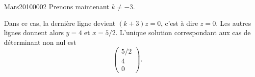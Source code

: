 \begin{corrige}{Mars20100002}
	Prenons maintenant $k\neq -3$.

	Dans ce cas, la dernière ligne devient $(k+3)z=0$, c'est à dire $z=0$. Les autres lignes donnent alors $y=4$ et $x=5/2$. L'unique solution correspondant aux cas de déterminant non nul est
	\begin{equation}
		\begin{pmatrix}
			5/2	\\ 
			4	\\ 
			0	
		\end{pmatrix}.
	\end{equation}

\end{corrige}
